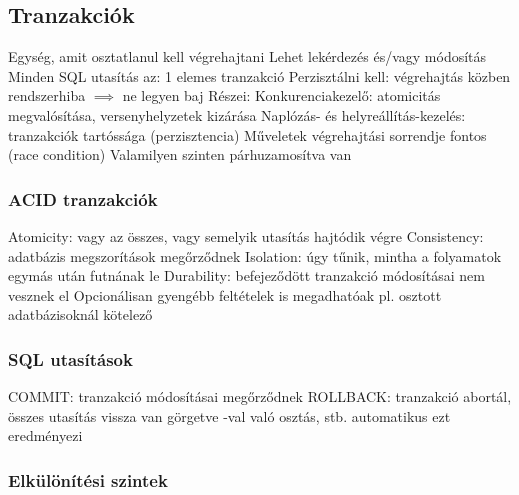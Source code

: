 \documentclass[12pt,a4paper]{article}
\begin{document}
\pagebreak

\subsection{Tranzakciók}

\begin{outline}
	\1 Egység, amit osztatlanul kell végrehajtani
	\1 Lehet lekérdezés és/vagy módosítás
	\1 Minden SQL utasítás az: 1 elemes tranzakció
	\1 Perzisztálni kell: végrehajtás közben rendszerhiba $\implies$ ne legyen baj
	\1 Részei:
		\2 Konkurenciakezelő: atomicitás megvalósítása, versenyhelyzetek kizárása
		\2 Naplózás- és helyreállítás-kezelés: tranzakciók tartóssága (perzisztencia)
	\1 Műveletek végrehajtási sorrendje fontos (race condition)
	\1 Valamilyen szinten párhuzamosítva van
\end{outline}

\subsubsection{ACID tranzakciók}

\begin{outline}
	\1 Atomicity: vagy az összes, vagy semelyik utasítás hajtódik végre
	\1 Consistency: adatbázis megszorítások megőrződnek
	\1 Isolation: úgy tűnik, mintha a folyamatok egymás után futnának le
	\1 Durability: befejeződött tranzakció módosításai nem vesznek el
	\1 Opcionálisan gyengébb feltételek is megadhatóak
		\2 pl. osztott adatbázisoknál kötelező
\end{outline}

\subsubsection{SQL utasítások}

\begin{outline}
	\1 COMMIT: tranzakció módosításai megőrződnek
	\1 ROLLBACK: tranzakció abortál, összes utasítás vissza van görgetve
		-val való osztás, stb. automatikus ezt eredményezi
\end{outline}

\pagebreak

\subsubsection{Elkülönítési szintek}
\end{document}
